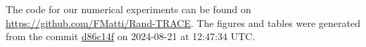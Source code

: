 The code for our numerical experiments can be found on \url{https://github.com/FMatti/Rand-TRACE}. The figures and tables were generated from the commit \href{https://github.com/FMatti/Rand-TRACE/tree/d86c14f}{d86c14f} on 2024-08-21 at 12:47:34 UTC.
